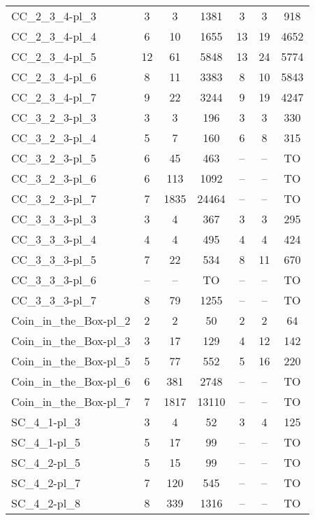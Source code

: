 \documentclass{article}
\newcommand{\unsolvedColumn}{--}
\newcommand{\myTO}{TO}
\begin{document}
\begin{longtable}[!ht]{l|ccc|ccc}
CC\_2\_3\_4-pl\_3 & 3 & 3 & 1381 & 3 & 3 & 918 \\
CC\_2\_3\_4-pl\_4 & 6 & 10 & 1655 & 13 & 19 & 4652 \\
CC\_2\_3\_4-pl\_5 & 12 & 61 & 5848 & 13 & 24 & 5774 \\
CC\_2\_3\_4-pl\_6 & 8 & 11 & 3383 & 8 & 10 & 5843 \\
CC\_2\_3\_4-pl\_7 & 9 & 22 & 3244 & 9 & 19 & 4247 \\
CC\_3\_2\_3-pl\_3 & 3 & 3 & 196 & 3 & 3 & 330 \\
CC\_3\_2\_3-pl\_4 & 5 & 7 & 160 & 6 & 8 & 315 \\
CC\_3\_2\_3-pl\_5 & 6 & 45 & 463 & \unsolvedColumn & \unsolvedColumn & \myTO \\
CC\_3\_2\_3-pl\_6 & 6 & 113 & 1092 & \unsolvedColumn & \unsolvedColumn & \myTO \\
CC\_3\_2\_3-pl\_7 & 7 & 1835 & 24464 & \unsolvedColumn & \unsolvedColumn & \myTO \\
CC\_3\_3\_3-pl\_3 & 3 & 4 & 367 & 3 & 3 & 295 \\
CC\_3\_3\_3-pl\_4 & 4 & 4 & 495 & 4 & 4 & 424 \\
CC\_3\_3\_3-pl\_5 & 7 & 22 & 534 & 8 & 11 & 670 \\
CC\_3\_3\_3-pl\_6 & \unsolvedColumn & \unsolvedColumn & \myTO & \unsolvedColumn & \unsolvedColumn & \myTO \\
CC\_3\_3\_3-pl\_7 & 8 & 79 & 1255 & \unsolvedColumn & \unsolvedColumn & \myTO \\
Coin\_in\_the\_Box-pl\_2 & 2 & 2 & 50 & 2 & 2 & 64 \\
Coin\_in\_the\_Box-pl\_3 & 3 & 17 & 129 & 4 & 12 & 142 \\
Coin\_in\_the\_Box-pl\_5 & 5 & 77 & 552 & 5 & 16 & 220 \\
Coin\_in\_the\_Box-pl\_6 & 6 & 381 & 2748 & \unsolvedColumn & \unsolvedColumn & \myTO \\
Coin\_in\_the\_Box-pl\_7 & 7 & 1817 & 13110 & \unsolvedColumn & \unsolvedColumn & \myTO \\
SC\_4\_1-pl\_3 & 3 & 4 & 52 & 3 & 4 & 125 \\
SC\_4\_1-pl\_5 & 5 & 17 & 99 & \unsolvedColumn & \unsolvedColumn & \myTO \\
SC\_4\_2-pl\_5 & 5 & 15 & 99 & \unsolvedColumn & \unsolvedColumn & \myTO \\
SC\_4\_2-pl\_7 & 7 & 120 & 545 & \unsolvedColumn & \unsolvedColumn & \myTO \\
SC\_4\_2-pl\_8 & 8 & 339 & 1316 & \unsolvedColumn & \unsolvedColumn & \myTO \\

\end{longtable}
\end{document}
